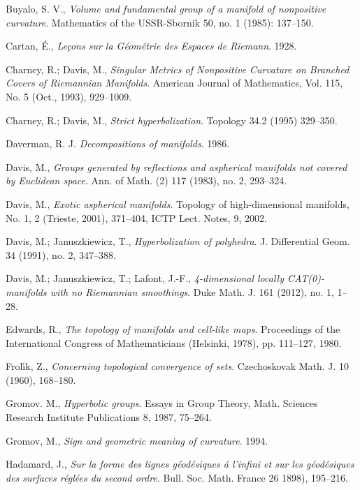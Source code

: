\begin{thebibliography}{52}
Buyalo, S. V.,
\textit{Volume and fundamental group of a manifold of nonpositive curvature}.
Mathematics of the USSR-Sbornik 50, no. 1 (1985): 137--150.

Cartan, \'E.,
\textit{Le\c{c}ons sur la G\'eom\'etrie des Espaces de Riemann}. 1928.

Charney, R.;
Davis, M.,
\textit{Singular Metrics of Nonpositive Curvature on Branched Covers of Riemannian Manifolds}.
American Journal of Mathematics, 
Vol. 115, 
No. 5 
(Oct., 1993), 
929--1009.

Charney, R.; Davis, M., 
\textit{Strict hyperbolization}.
Topology 
34.2 
(1995) 
329--350.

Daverman, R. J.
\textit{Decompositions of manifolds}. 1986.

Davis, M., 
\textit{Groups generated by reflections and aspherical manifolds not covered by Euclidean space}.
Ann. of Math. 
(2) 117 
(1983), 
no. 2, 
293--324. 

Davis, M.,
\textit{Exotic aspherical manifolds}.
Topology of high-dimensional manifolds, 
No. 1, 2 (Trieste, 2001), 371--404, ICTP Lect. Notes, 9, 2002.



Davis, M.; 
Januszkiewicz, T., 
\textit{Hyperbolization of polyhedra}. 
J. Differential Geom. 
34 
(1991), 
no. 2, 
347--388.

Davis, M.; 
Januszkiewicz, T.; 
Lafont, J.-F.,
\textit{4-dimensional locally CAT(0)-manifolds with no Riemannian smoothings}. 
Duke Math. J. 
161 
(2012), 
no. 1, 
1--28.

Edwards, R.,
\textit{The topology of manifolds and cell-like maps}.
Proceedings of the International Congress of Mathematicians (Helsinki, 1978), pp. 111--127, 1980.

Frol\'{\i}k, Z., 
\textit{Concerning topological convergence of sets}.
Czechoskovak Math. J. 
10 
(1960), 
168--180.

Gromov. M.,
\textit{Hyperbolic groups}. 
Essays in Group Theory,
Math. Sciences Research Institute Publications 8,
1987, 75--264.

Gromov, M.,
\textit{Sign and geometric meaning of curvature}.
1994.

Hadamard, J.,
\textit{Sur la forme des lignes g\'eod\'esiques \'a l'infini et sur les g\'eod\'esiques des surfaces r\'egl\'ees du second ordre}.
Bull. Soc. Math. France 
26 
1898), 
195--216.


\end{thebibliography}
